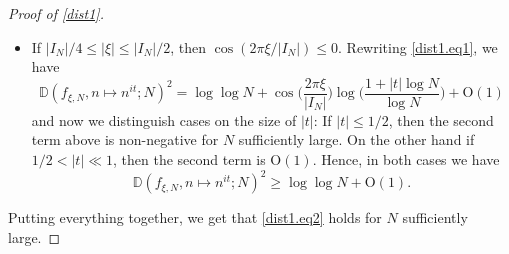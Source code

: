 \documentclass[letter,11pt]{article}
\theoremstyle{plain} %
\theoremstyle{definition} %
\theoremstyle{plain}
\theoremstyle{plain}
\theoremstyle{plain}
\numberwithin{equation}{section}
\newcommand{\Oh}{{\mathrm O}}
\renewcommand{\leq}{\leqslant}
\renewcommand{\geq}{\geqslant}
\newcommand{\Dist}{\mathbb{D}}
\newcommand{\1}{\mathbbm{1}}
\newcommand{\f}{f_{\xi,N}}
\begin{document}
\begin{proof}[Proof of \cref{dist1}]
\begin{itemize}
\begin{equation}
    \end{equation}
    \begin{itemize}
        \item  If $|\xi|\leq \sqrt{|I_N|}$, then \eqref{Laurent_exp} gives that
        for $N$ sufficiently large, 
        $$1-\cos\bigg(\frac{2\pi\xi}{|I_N|}\bigg) 
        = \frac{2\pi^2\xi^2}{|I_N|^2} + \Oh\bigg(\frac{1}{|I_N|^2}\bigg),$$
        hence 
        $$\Dist(\f,n\mapsto n^{it};N)^2 
        \geq \frac{\pi^2\xi^2}{2A^2} + \Oh(1).$$
        \item If $\sqrt{|I_N|}<|\xi|\leq|I_N|/4$, then by monotonicity and \eqref{Laurent_exp}, we have
        $$1-\cos\bigg(\frac{2\pi\xi}{|I_N|}\bigg) > 1 - \cos\bigg(\frac{2\pi}{\sqrt{|I_N|}}\bigg) = \frac{2\pi^2}{|I_N|} + \Oh\bigg(\frac{1}{|I_N|^2}\bigg),$$
        thus,
        $$\Dist(\f,n\mapsto n^{it};N)^2 \geq \frac{\pi^2(\log\log{N})}{A} + \Oh(1).$$
    \end{itemize}
    \item If $|I_N|/4\leq |\xi| \leq |I_N|/2$, then $\cos(2\pi\xi/|I_N|)\leq 0$. Rewriting \eqref{dist1.eq1}, we have
    $$\Dist(\f,n\mapsto n^{it};N)^2
    = \log\log{N} + \cos\bigg(\frac{2\pi\xi}{|I_N|}\bigg)\log\bigg(\frac{1+|t|\log{N}}{\log{N}}\bigg) + \Oh(1)$$
    and now we distinguish cases on the size of $|t|$:
    If $|t|\leq 1/2$, then the second term above is non-negative for $N$ sufficiently large. On the other hand if $1/2<|t|\ll 1$, then the second term is $\Oh(1)$. Hence, in both cases we have
    $$\Dist(\f,n\mapsto n^{it};N)^2 \geq \log\log{N} + \Oh(1).$$
\end{itemize}
Putting everything together, we get that \eqref{dist1.eq2} holds for $N$ sufficiently large.
\end{proof}
\end{document}
